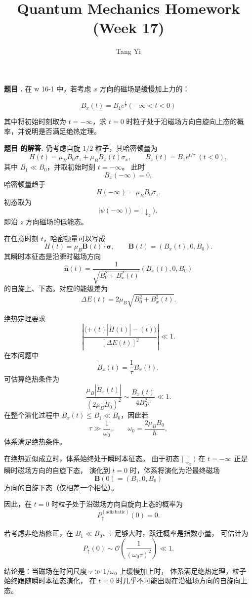\documentclass[12pt, a4paper, oneside]{ctexart}
\title{Quantum Mechanics Homework (Week 17)}
\author{Tang Yi \\ [学号已脱敏]}
\newcounter{problemname}
\newenvironment{problem}
  {\begin{shaded}\stepcounter{problemname}\par\noindent\textbf{题目 \theproblemname. }}
  {\end{shaded}\par}
\newenvironment{solution}
  {\par\noindent\textbf{题目 \theproblemname 的解答. }}
  {\par}
\begin{document}
\maketitle


\begin{problem}
  在 w 16-1 中，若考虑 $x$ 方向的磁场是缓慢加上力的：

$$B_x(t) = B_1 e^{\frac{t}{\tau}} (-\infty < t < 0)$$

其中将初始时刻取为 $t = -\infty$，求 $t = 0$ 时粒子处于沿磁场方向自旋向上态的概率，并说明是否满足绝热定理。
\end{problem}

\begin{solution}
仍考虑自旋 $1/2$ 粒子，其哈密顿量为
\[
H(t)=\mu_B B_0\sigma_z+\mu_B B_x(t)\sigma_x,
\qquad 
B_x(t)=B_1 e^{t/\tau}\;(t<0),
\]
其中 $B_1\ll B_0$，并取初始时刻 $t=-\infty$。
此时
\[
B_x(-\infty)=0,
\]
哈密顿量趋于
\[
H(-\infty)=\mu_B B_0\sigma_z.
\]
初态取为
\[
|\psi(-\infty)\rangle=|\downarrow_z\rangle,
\]
即沿 $z$ 方向磁场的低能态。

在任意时刻 $t$，哈密顿量可以写成
\[
H(t)=\mu_B \mathbf B(t)\cdot\boldsymbol{\sigma},
\qquad 
\mathbf B(t)=(B_x(t),0,B_0).
\]
其瞬时本征态是沿瞬时磁场方向
\[
\hat{\mathbf n}(t)
=\frac{1}{\sqrt{B_0^2+B_x^2(t)}}(B_x(t),0,B_0)
\]
的自旋上、下态。对应的能级差为
\[
\Delta E(t)=2\mu_B\sqrt{B_0^2+B_x^2(t)}.
\]

绝热定理要求
\[
\left|
\frac{\langle +(t)|\dot H(t)|-(t)\rangle}
{[\Delta E(t)]^2}
\right|
\ll 1.
\]
在本问题中
\[
\dot B_x(t)=\frac{1}{\tau}B_x(t),
\]
可估算绝热条件为
\[
\frac{\mu_B |\dot B_x(t)|}{(2\mu_B B_0)^2}
\sim
\frac{B_x(t)}{4B_0^2\tau}
\ll 1.
\]
在整个演化过程中 $B_x(t)\le B_1\ll B_0$，因此若
\[
\tau \gg \frac{1}{\omega_0},
\qquad
\omega_0=\frac{2\mu_B B_0}{\hbar},
\]
体系满足绝热条件。

在绝热近似成立时，体系始终处于瞬时本征态。
由于初态 $|\downarrow_z\rangle$ 在 $t=-\infty$ 正是瞬时磁场方向的自旋下态，
演化到 $t=0$ 时，体系将演化为沿最终磁场
\[
\mathbf B(0)=(B_1,0,B_0)
\]
方向的自旋下态（仅相差一个相位）。

因此，在 $t=0$ 时粒子处于沿磁场方向自旋向上态的概率为
\[
P_{\uparrow}^{(\text{adiabatic})}(0)=0.
\]

若考虑非绝热修正，在 $B_1\ll B_0$、$\tau$ 足够大时，跃迁概率是指数小量，
可估计为
\[
P_{\uparrow}(0)\sim 
\mathcal O\!\left(\frac{1}{(\omega_0\tau)^2}\right)\ll1.
\]

结论是：当磁场在时间尺度 $\tau\gg 1/\omega_0$ 上缓慢加上时，
体系满足绝热定理，粒子始终跟随瞬时本征态演化，
在 $t=0$ 时几乎不可能出现在沿磁场方向的自旋向上态。

\end{solution}
\end{document}
